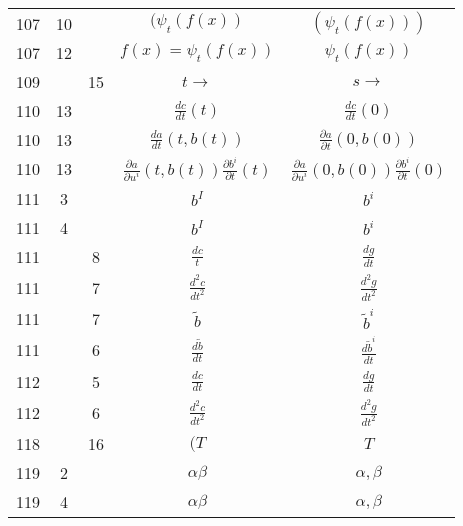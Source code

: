 \documentclass[a4paper,11pt]{article}
\begin{document}
\begin{center}
\begin{tabular}{|c|c|c|c|c|}
    107 & 10 & & $( \psi_{ t } ( f( x ) )$ & $( \psi_{ t } ( f( x ) ) )$ \\
    107 & 12 & & $f( x ) = \psi_{ t } ( f( x ) )$
           & $\psi_{ t } ( f( x ) )$ \\
    109 & & 15 & $t \to$ & $s \to$ \\
    110 & 13 & & $\frac{ d c }{ dt }( t )$
           & $\frac{ d c }{ dt }( 0 )$ \\
    110 & 13 & & $\frac{ d a }{ dt }( t, b( t ) )$
           & $\frac{ \partial a }{ \partial t }( 0, b( 0 ) )$ \\
    110 & 13 & & $\frac{ \partial a }{ \partial u^{ i } }( t, b( t ) )
                 \frac{ \partial b^{ i } }{ \partial t }( t )$
           & $\frac{ \partial a }{ \partial u^{ i } }( 0, b( 0 ) )
             \frac{ \partial b^{ i } }{ \partial t }( 0 )$ \\
    111 &  3 & & $b^{ I }$ & $b^{ i }$ \\
    111 &  4 & & $b^{ I }$ & $b^{ i }$ \\
    111 & &  8 & $\frac{ d c }{ t }$ & $\frac{ d g }{ dt }$ \\
    111 & &  7 & $\frac{ d^{ 2 } c }{ dt^{ 2 } }$
           & $\frac{ d^{ 2 } g }{ dt^{ 2 } }$ \\
    111 & &  7 & $\widetilde{ b }$ & $\widetilde{ b }^{ i }$ \\
    111 & &  6 & $\frac{ d \widetilde{ b } }{ dt }$
           & $\frac{ d \widetilde{ b }^{ i } }{ dt }$ \\
    112 & &  5 & $\frac{ d c }{ dt }$ & $\frac{ d g }{ dt }$ \\
    112 & &  6 & $\frac{ d^{ 2 } c }{ dt^{ 2 } }$
           & $\frac{ d^{ 2 } g }{ dt^{ 2 } }$ \\
    118 & & 16 & $( T$ & $T$ \\
    119 &  2 & & $\alpha\beta$ & $\alpha, \beta$ \\
    119 &  4 & & $\alpha\beta$ & $\alpha, \beta$ \\
    \hline
  \end{tabular}






\end{center}
\end{document}
